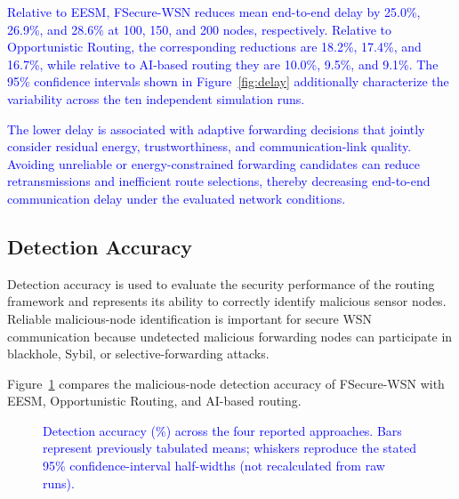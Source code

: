 \documentclass[pdflatex,sn-mathphys-num]{sn-jnl}
\newcommand{\Revised}[1]{\textcolor{blue}{#1}}
\begin{document}
\textcolor{blue}{Relative to EESM, FSecure-WSN reduces mean end-to-end delay
by 25.0\%, 26.9\%, and 28.6\% at 100, 150, and 200 nodes, respectively.
Relative to Opportunistic Routing, the corresponding reductions are 18.2\%,
17.4\%, and 16.7\%, while relative to AI-based routing they are 10.0\%,
9.5\%, and 9.1\%. The 95\% confidence intervals shown in
Figure~\ref{fig:delay} additionally characterize the variability across the
ten independent simulation runs.}

\textcolor{blue}{The lower delay is associated with adaptive forwarding
decisions that jointly consider residual energy, trustworthiness, and
communication-link quality. Avoiding unreliable or energy-constrained
forwarding candidates can reduce retransmissions and inefficient route
selections, thereby decreasing end-to-end communication delay under the
evaluated network conditions.}


\subsection{Detection Accuracy}

Detection accuracy is used to evaluate the security performance of the
routing framework and represents its ability to correctly identify malicious
sensor nodes. Reliable malicious-node identification is important for secure
WSN communication because undetected malicious forwarding nodes can
participate in blackhole, Sybil, or selective-forwarding attacks.

Figure~\ref{fig:accuracy} compares the malicious-node detection accuracy of
FSecure-WSN with EESM, Opportunistic Routing, and AI-based routing.

\begin{figure}[!tb]
\centering
{}
\caption{\Revised{Detection accuracy (\%) across the four reported approaches. Bars represent previously tabulated means; whiskers reproduce the stated 95\% confidence-interval half-widths (not recalculated from raw runs).}}
\label{fig:accuracy}
\end{figure}
\end{document}
